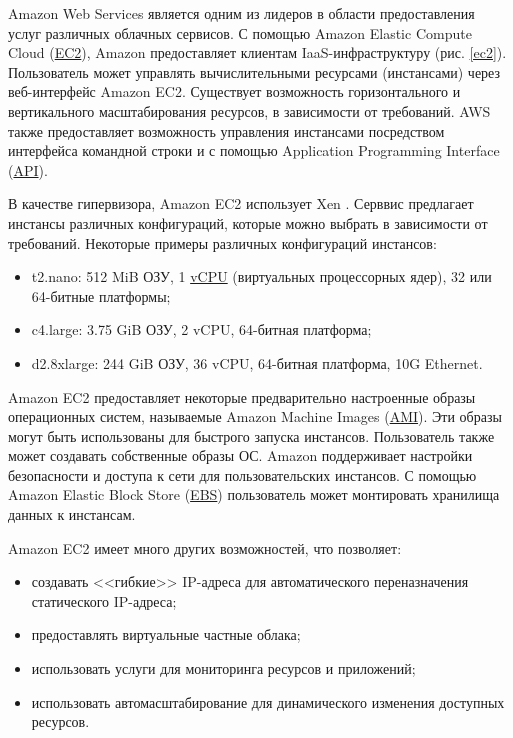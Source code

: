 Amazon Web Services является одним из лидеров в области предоставления услуг различных облачных сервисов.
С помощью Amazon Elastic Compute Cloud (\hyperlink{ec2}{EC2}), Amazon предоставляет клиентам IaaS-инфраструктуру (рис. \ref{ec2}).
Пользователь может управлять вычислительными ресурсами (инстансами) через веб-интерфейс Amazon EC2.
Существует возможность горизонтального и вертикального масштабирования ресурсов, в зависимости от требований.
AWS также предоставляет возможность управления инстансами посредством интерфейса командной строки и с помощью Application Programming Interface (\hyperlink{api}{API}).


В качестве гипервизора, Amazon EC2 использует Xen \cite{xen}.
Серввис предлагает инстансы различных конфигураций, которые можно выбрать в зависимости от требований.
Некоторые примеры различных конфигураций инстансов:
\begin{itemize}
  \item t2.nano: 512 MiB ОЗУ, 1 \hyperlink{vcpu}{vCPU} (виртуальных процессорных ядер), 32 или 64-битные платформы;
  \item c4.large: 3.75 GiB ОЗУ, 2 vCPU, 64-битная платформа;
  \item d2.8xlarge: 244 GiB ОЗУ, 36 vCPU, 64-битная платформа, 10G Ethernet.
\end{itemize}

Amazon EC2 предоставляет некоторые предварительно настроенные образы операционных систем, называемые Amazon Machine Images (\hyperlink{ami}{AMI}).
Эти образы могут быть использованы для быстрого запуска инстансов.
Пользователь также может создавать собственные образы ОС.
Amazon поддерживает настройки безопасности и доступа к сети для пользовательских инстансов.
С помощью Amazon Elastic Block Store (\hyperlink{ebs}{EBS}) пользователь может монтировать хранилища данных к инстансам.

Amazon EC2 имеет много других возможностей, что позволяет:
\begin{itemize}
  \item создавать <<гибкие>> IP-адреса для автоматического переназначения статического IP-адреса;
  \item предоставлять виртуальные частные облака;
  \item использовать услуги для мониторинга ресурсов и приложений;
  \item использовать автомасштабирование для динамического изменения доступных ресурсов.
\end{itemize}

